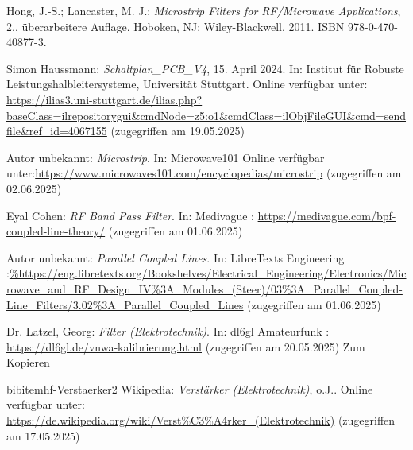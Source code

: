 
\begin{thebibliography}{1}
Hong, J.-S.; Lancaster, M. J.: \emph{Microstrip Filters for RF/Microwave Applications}, 2., überarbeitere Auflage. Hoboken, NJ: Wiley-Blackwell, 2011. ISBN 978-0-470-40877-3.

Simon Haussmann: \emph{Schaltplan\_PCB\_V4}, 15. April 2024. In: Institut für Robuste Leistungshalbleitersysteme, Universität Stuttgart. Online verfügbar unter: \url{https://ilias3.uni-stuttgart.de/ilias.php?baseClass=ilrepositorygui&cmdNode=z5:o1&cmdClass=ilObjFileGUI&cmd=sendfile&ref_id=4067155} (zugegriffen am 19.05.2025)


Autor unbekannt: \emph{Microstrip}. In: Microwave101 Online verfügbar unter:\url{https://www.microwaves101.com/encyclopedias/microstrip} (zugegriffen am 02.06.2025)


Eyal Cohen: \emph{RF Band Pass Filter}. In: Medivague : \url{https://medivague.com/bpf-coupled-line-theory/} (zugegriffen am 01.06.2025)

Autor unbekannt: \emph{Parallel Coupled Lines}. In: LibreTexts Engineering :\url{%https://eng.libretexts.org/Bookshelves/Electrical_Engineering/Electronics/Microwave_and_RF_Design_IV%3A_Modules_(Steer)/03%3A_Parallel_Coupled-Line_Filters/3.02%3A_Parallel_Coupled_Lines} (zugegriffen am 01.06.2025)


Dr.  Latzel, Georg: \emph{Filter (Elektrotechnik)}. In: dl6gl Amateurfunk : \url{https://dl6gl.de/vnwa-kalibrierung.html} (zugegriffen am 20.05.2025) Zum Kopieren
  

bibitem{hf-Verstaerker2}
Wikipedia: \emph{Verstärker (Elektrotechnik)}, o.J.. Online verfügbar unter: \url{https://de.wikipedia.org/wiki/Verst%C3%A4rker_(Elektrotechnik)} (zugegriffen am 17.05.2025)



\end{thebibliography}

\clearpage
